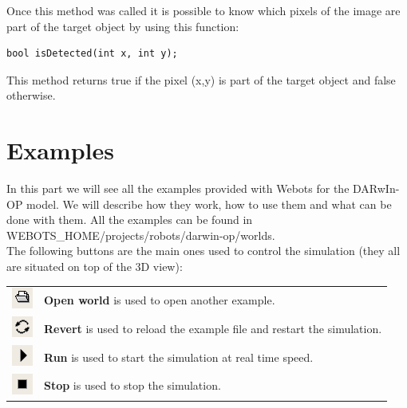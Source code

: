 \documentclass[a4paper, 12pt]{article}  		%
\begin{document}
Once this method was called it is possible to know which pixels of the image are part of the target object by using this function:\\

\lstset{language=c++} 
\lstset{commentstyle=\textit} 
\begin{lstlisting} 
bool isDetected(int x, int y);
\end{lstlisting}

This method returns true if the pixel (x,y) is part of the target object and false otherwise.\\



\newpage
\section{Examples}

In this part we will see all the examples provided with Webots for the DARwIn-OP model. We will describe how they work, how to use them and what can be done with them. All the examples can be found in WEBOTS\_HOME/projects/robots/darwin-op/worlds.\\

The following buttons are the main ones used to control the simulation (they all are situated on top of the 3D view):
\begin{table}[H]
\begin{center}
\begin{tabular}{ c l }
\includegraphics{button_open.png} & \textbf{Open world} is used to open another example. \\
\includegraphics{button_revert.png} & \textbf{Revert} is used to reload the example file and restart the simulation. \\
\includegraphics{button_play.png} & \textbf{Run} is used to start the simulation at real time speed. \\
\includegraphics{button_stop.png} & \textbf{Stop} is used to stop the simulation. \\
\end{tabular}
\end{center}
\end{table}
\end{document}
